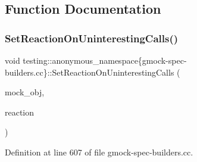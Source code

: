 \subsection{Function Documentation}
\mbox{\label{namespacetesting_1_1anonymous__namespace_02gmock-spec-builders_8cc_03_a4b6c5727bdd640c48b03da3a39b66f8e}} 
\subsubsection{\texorpdfstring{Set\+Reaction\+On\+Uninteresting\+Calls()}{SetReactionOnUninterestingCalls()}}
{\footnotesize\ttfamily void testing\+::anonymous\+\_\+namespace\{gmock-\/spec-\/builders.\+cc\}\+::Set\+Reaction\+On\+Uninteresting\+Calls (\begin{DoxyParamCaption}\item[{const void $\ast$}]{mock\+\_\+obj,  }\item[{\hyperlink{namespacetesting_1_1internal_adfcd859062983a889f4bd18e6977357e}{internal\+::\+Call\+Reaction}}]{reaction }\end{DoxyParamCaption})}



Definition at line 607 of file gmock-\/spec-\/builders.\+cc.



